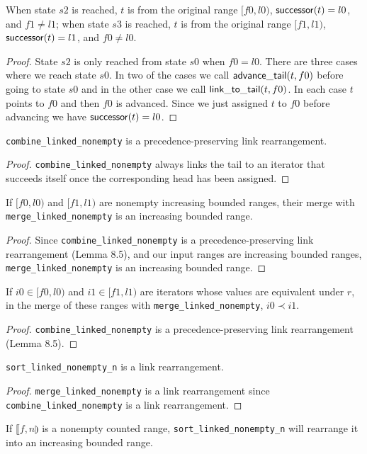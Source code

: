 \begin{lemma}
	When state $s2$ is reached, $t$ is from the original range $[f0, l0)$, $\mathsf{successor}(t) = l0$, and
	$f1 \neq l1$; when state $s3$ is reached, $t$ is from the original range $[f1, l1)$,
	$\mathsf{successor}(t) = l1$, and $f0 \neq l0$.
\end{lemma}

\begin{proof}
	State $s2$ is only reached from state $s0$ when $f0 = l0$. There are three cases where we reach state
	$s0$. In two of the cases we call $\mathsf{advance\_tail}(t, f0)$ before going to state $s0$ and in the other
	case we call $\mathsf{link\_to\_tail}(t, f0)$. In each case $t$ points to $f0$ and then $f0$ is advanced.
	Since we just assigned $t$ to $f0$ before advancing we have $\mathsf{successor}(t) = l0$.
\end{proof}

\begin{lemma}
	\verb|combine_linked_nonempty| is a precedence-preserving link rearrangement.
\end{lemma}

\begin{proof}
	\verb|combine_linked_nonempty| always links the tail to an iterator that succeeds itself once the
	corresponding head has been assigned.
\end{proof}

\begin{lemma}
	If $[f0, l0)$ and $[f1, l1)$ are nonempty increasing bounded ranges, their merge with
	\verb|merge_linked_nonempty| is an increasing bounded range.
\end{lemma}

\begin{proof}
	Since \verb|combine_linked_nonempty| is a precedence-preserving link rearrangement (Lemma 8.5), and
	our input ranges are increasing bounded ranges, \verb|merge_linked_nonempty| is an increasing bounded
	range.
\end{proof}

\begin{lemma}
	If $i0 \in [f0, l0)$ and $i1 \in [f1, l1)$ are iterators whose values are equivalent under $r$, in the
	merge of these ranges with \verb|merge_linked_nonempty|, $i0 \prec i1$.
\end{lemma}

\begin{proof}
	\verb|combine_linked_nonempty| is a precedence-preserving link rearrangement (Lemma 8.5).
\end{proof}

\begin{lemma}
	\verb|sort_linked_nonempty_n| is a link rearrangement.
\end{lemma}

\begin{proof}
	\verb|merge_linked_nonempty| is a link rearrangement since \verb|combine_linked_nonempty| is a link
	rearrangement.
\end{proof}

\begin{lemma}
	If $\llbracket f, n \rrparenthesis$ is a nonempty counted range, \verb|sort_linked_nonempty_n| will
	rearrange it into an increasing bounded range.
\end{lemma}
